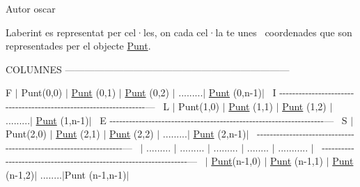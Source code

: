 \begin{DoxyAuthor}{Autor}
oscar
\end{DoxyAuthor}
Laberint es representat per cel·les, on cada cel·la te unes~\newline
coordenades que son representades per el objecte \hyperlink{classlogica_1_1_punt}{Punt}.~\newline
~\newline
\begin{DoxyVerb}                        COLUMNES\n
---------------------------------------------------------------------\n
\end{DoxyVerb}
 F $\vert$ Punt(0,0) $\vert$ \hyperlink{classlogica_1_1_punt}{Punt} (0,1) $\vert$ \hyperlink{classlogica_1_1_punt}{Punt} (0,2) $\vert$ .........$\vert$ \hyperlink{classlogica_1_1_punt}{Punt} (0,n-\/1)$\vert$~\newline
 I -\/-\/-\/-\/-\/-\/-\/-\/-\/-\/-\/-\/-\/-\/-\/-\/-\/-\/-\/-\/-\/-\/-\/-\/-\/-\/-\/-\/-\/-\/-\/-\/-\/-\/-\/-\/-\/-\/-\/-\/-\/-\/-\/-\/-\/-\/-\/-\/-\/-\/-\/-\/-\/-\/-\/-\/-\/-\/-\/-\/-\/-\/-\/-\/-\/-\/---~\newline
 L $\vert$ Punt(1,0) $\vert$ \hyperlink{classlogica_1_1_punt}{Punt} (1,1) $\vert$ \hyperlink{classlogica_1_1_punt}{Punt} (1,2) $\vert$ .........$\vert$ \hyperlink{classlogica_1_1_punt}{Punt} (1,n-\/1)$\vert$~\newline
 E -\/-\/-\/-\/-\/-\/-\/-\/-\/-\/-\/-\/-\/-\/-\/-\/-\/-\/-\/-\/-\/-\/-\/-\/-\/-\/-\/-\/-\/-\/-\/-\/-\/-\/-\/-\/-\/-\/-\/-\/-\/-\/-\/-\/-\/-\/-\/-\/-\/-\/-\/-\/-\/-\/-\/-\/-\/-\/-\/-\/-\/-\/-\/-\/-\/-\/---~\newline
 S $\vert$ Punt(2,0) $\vert$ \hyperlink{classlogica_1_1_punt}{Punt} (2,1) $\vert$ \hyperlink{classlogica_1_1_punt}{Punt} (2,2) $\vert$ .........$\vert$ \hyperlink{classlogica_1_1_punt}{Punt} (2,n-\/1)$\vert$~\newline
 -\/-\/-\/-\/-\/-\/-\/-\/-\/-\/-\/-\/-\/-\/-\/-\/-\/-\/-\/-\/-\/-\/-\/-\/-\/-\/-\/-\/-\/-\/-\/-\/-\/-\/-\/-\/-\/-\/-\/-\/-\/-\/-\/-\/-\/-\/-\/-\/-\/-\/-\/-\/-\/-\/-\/-\/-\/-\/-\/-\/-\/-\/-\/-\/-\/-\/---~\newline
 $\vert$ ......... $\vert$ ......... $\vert$ ......... $\vert$ ........ $\vert$ ........... $\vert$~\newline
 -\/-\/-\/-\/-\/-\/-\/-\/-\/-\/-\/-\/-\/-\/-\/-\/-\/-\/-\/-\/-\/-\/-\/-\/-\/-\/-\/-\/-\/-\/-\/-\/-\/-\/-\/-\/-\/-\/-\/-\/-\/-\/-\/-\/-\/-\/-\/-\/-\/-\/-\/-\/-\/-\/-\/-\/-\/-\/-\/-\/-\/-\/-\/-\/-\/-\/---~\newline
 $\vert$ \hyperlink{classlogica_1_1_punt}{Punt}(n-\/1,0) $\vert$ \hyperlink{classlogica_1_1_punt}{Punt} (n-\/1,1) $\vert$ \hyperlink{classlogica_1_1_punt}{Punt} (n-\/1,2)$\vert$ ........$\vert$\+Punt (n-\/1,n-\/1)$\vert$ ~\newline
